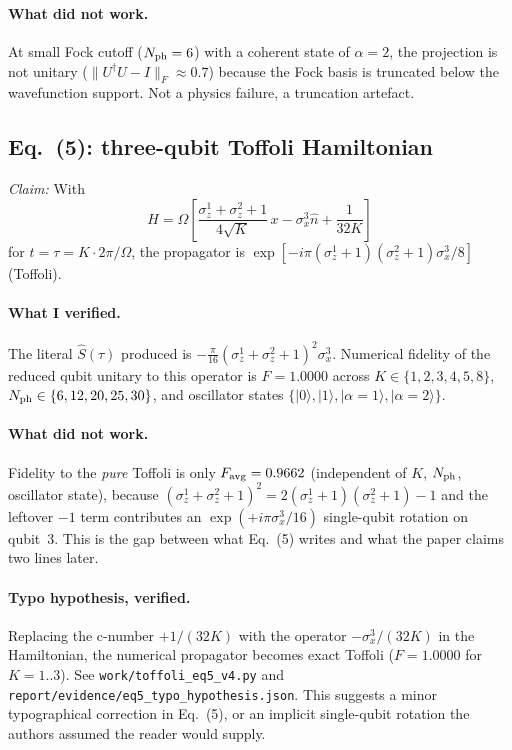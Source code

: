 \documentclass[11pt]{article}
\begin{document}
\paragraph{What did not work.} At small Fock cutoff ($N_{\rm ph}=6$) with a coherent state
of $\alpha=2$, the projection is not unitary ($\|U^\dagger U-I\|_F\approx 0.7$) because the
Fock basis is truncated below the wavefunction support.  Not a physics failure, a
truncation artefact.

\subsection{Eq.~(5): three-qubit Toffoli Hamiltonian}
\emph{Claim:} With
\[
H = \Omega\left[\frac{\sigma_z^1+\sigma_z^2+1}{4\sqrt K}\,x - \sigma_x^3 \hat n + \frac{1}{32K}\right]
\]
for $t=\tau=K\cdot 2\pi/\Omega$, the propagator is $\exp[-i\pi(\sigma_z^1+1)(\sigma_z^2+1)\sigma_x^3/8]$ (Toffoli).

\paragraph{What I verified.} The literal $\hat S(\tau)$ produced is
$-\frac{\pi}{16}(\sigma_z^1+\sigma_z^2+1)^2\sigma_x^3$.  Numerical fidelity of the reduced
qubit unitary to this operator is $F=1.0000$ across $K\in\{1,2,3,4,5,8\}$,
$N_{\rm ph}\in\{6,12,20,25,30\}$, and oscillator states $\{|0\rangle,|1\rangle,|\alpha=1\rangle,|\alpha=2\rangle\}$.

\paragraph{What did not work.} Fidelity to the \emph{pure} Toffoli is only $F_{\rm avg}=0.9662$
(independent of $K$, $N_{\rm ph}$, oscillator state), because
$(\sigma_z^1+\sigma_z^2+1)^2 = 2(\sigma_z^1+1)(\sigma_z^2+1)-1$ and the leftover $-1$ term
contributes an $\exp(+i\pi\sigma_x^3/16)$ single-qubit rotation on qubit~3.  This is the
gap between what Eq.~(5) writes and what the paper claims two lines later.

\paragraph{Typo hypothesis, verified.} Replacing the c-number $+1/(32K)$ with the operator
$-\sigma_x^3/(32K)$ in the Hamiltonian, the numerical propagator becomes exact Toffoli
($F=1.0000$ for $K=1..3$).  See \verb|work/toffoli_eq5_v4.py| and
\verb|report/evidence/eq5_typo_hypothesis.json|.  This suggests a minor typographical
correction in Eq.~(5), or an implicit single-qubit rotation the authors assumed the reader
would supply.
\end{document}
